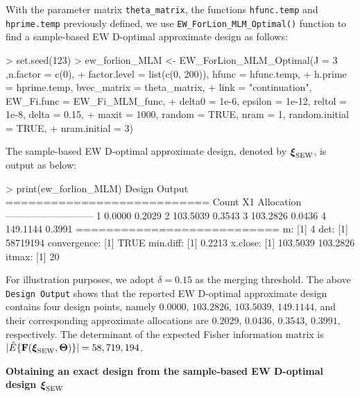 With the parameter matrix \verb|theta_matrix|, the functions \texttt{hfunc.temp} and \texttt{hprime.temp} previously defined, we use \verb|EW_ForLion_MLM_Optimal()| function to find a sample-based EW D-optimal approximate design as follows:
\begin{example}
> set.seed(123)
> ew_forlion_MLM <- EW_ForLion_MLM_Optimal(J = 3 ,n.factor = c(0),
+                   factor.level = list(c(0, 200)), hfunc = hfunc.temp, 
+                   h.prime = hprime.temp, bvec_matrix = theta_matrix, 
+                   link = "continuation", EW_Fi.func = EW_Fi_MLM_func, 
+                   delta0 = 1e-6, epsilon = 1e-12, reltol = 1e-8, delta = 0.15, 
+                   maxit = 1000, random = TRUE, nram = 1, random.initial = TRUE, 
+                   nram.initial = 3)
\end{example}
The sample-based EW D-optimal approximate design, denoted by $\boldsymbol{\xi}_{\rm SEW}$, is output as below: 
\begin{example}
> print(ew_forlion_MLM)
Design Output
=========================== 
Count  X1        Allocation
--------------------------- 
1        0.0000  0.2029
2      103.5039  0.3543
3      103.2826  0.0436
4      149.1144  0.3991
=========================== 
m:
[1] 4
det:
[1] 58719194
convergence:
[1] TRUE
min.diff:
[1] 0.2213
x.close:
[1] 103.5039 103.2826
itmax:
[1] 20
\end{example}

For illustration purposes, we adopt $\delta=0.15$ as the merging threshold. The above \verb|Design Output| shows that the reported EW D-optimal approximate design contains four design points, namely $0.0000$, $103.2826$, $103.5039$, $149.1144$, and their corresponding approximate allocations are $0.2029$, $0.0436$, $0.3543$, $0.3991$, respectively. The determinant of the expected Fisher information matrix is $| \hat{E}\{{\mathbf F}({\boldsymbol \xi}_{\rm SEW}, \boldsymbol{\Theta})\}|=58,719,194$. 

\medskip
\noindent
{\bf Obtaining an exact design from the sample-based EW D-optimal design ${\boldsymbol{\xi}}_{\rm SEW}$}
\smallskip

